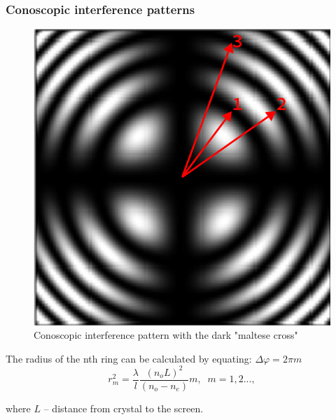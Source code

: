 \documentclass{beamer}
\begin{document}
	\begin{frame}
		\frametitle{Conoscopic interference patterns}
		
		\begin{figure}
			\centering
			\includegraphics[width=0.5\linewidth]{res/pattern.png}
			\caption{Conoscopic interference pattern with the dark "maltese cross"}
		\end{figure}
		
		\footnotesize
		The radius of the nth ring can be calculated by equating: $\Delta \varphi = 2 \pi m$
		$$r^2_m = \frac{\lambda}{l} \frac{(n_o L)^2}{(n_o - n_e)} m,\;\; m = 1,2...,$$
		
		where $L$ -- distance from crystal to the screen.
	\end{frame}
\end{document}
